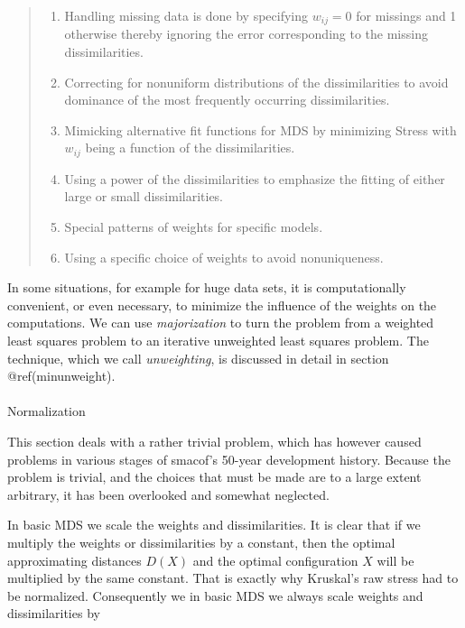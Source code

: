 \documentclass[
  12pt,
  letterpaper,
  DIV=11,
  numbers=noendperiod]{scrartcl}
\makeatletter
\let\oldparagraph\paragraph
\renewcommand{\paragraph}{
    \@ifstar
      \xxxParagraphStar
      \xxxParagraphNoStar
  }
\newcommand{\xxxParagraphStar}[1]{\oldparagraph*{#1}\mbox{}}
\newcommand{\xxxParagraphNoStar}[1]{\oldparagraph{#1}\mbox{}}
\providecommand{\tightlist}{%
  \setlength{\itemsep}{0pt}\setlength{\parskip}{0pt}}\usepackage{longtable,booktabs,array}
\makeatother
\begin{document}
\begin{quote}
\begin{enumerate}
\def\labelenumi{\arabic{enumi}.}
\tightlist
\item
  Handling missing data is done by specifying \(w_{ij} = 0\) for
  missings and 1 otherwise thereby ignoring the error corresponding to
  the missing dissimilarities.
\item
  Correcting for nonuniform distributions of the dissimilarities to
  avoid dominance of the most frequently occurring dissimilarities.
\item
  Mimicking alternative fit functions for MDS by minimizing Stress with
  \(w_{ij}\) being a function of the dissimilarities.
\item
  Using a power of the dissimilarities to emphasize the ﬁtting of either
  large or small dissimilarities.
\item
  Special patterns of weights for speciﬁc models.
\item
  Using a speciﬁc choice of weights to avoid nonuniqueness.
\end{enumerate}
\end{quote}

In some situations, for example for huge data sets, it is
computationally convenient, or even necessary, to minimize the influence
of the weights on the computations. We can use \emph{majorization} to
turn the problem from a weighted least squares problem to an iterative
unweighted least squares problem. The technique, which we call
\emph{unweighting}, is discussed in detail in section @ref(minunweight).

\paragraph{Normalization}\label{intronorm}

This section deals with a rather trivial problem, which has however
caused problems in various stages of smacof's 50-year development
history. Because the problem is trivial, and the choices that must be
made are to a large extent arbitrary, it has been overlooked and
somewhat neglected.

In basic MDS we scale the weights and dissimilarities. It is clear that
if we multiply the weights or dissimilarities by a constant, then the
optimal approximating distances \(D(X)\) and the optimal configuration
\(X\) will be multiplied by the same constant. That is exactly why
Kruskal's raw stress had to be normalized. Consequently we in basic MDS
we always scale weights and dissimilarities by
\end{document}

